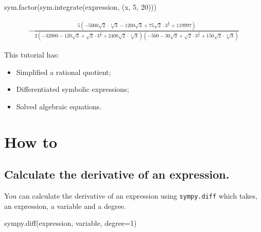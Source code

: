 \begin{pyin}
sym.factor(sym.integrate(expression, (x, 5, 20)))
\end{pyin}




\begin{equation*}
\begin{split}\displaystyle - \frac{5 \left(- 5000 \sqrt{2} \cdot \sqrt[4]{3} - 1200 \sqrt{3} + 75 \sqrt{2} \cdot 3^{\frac{3}{4}} + 119997\right)}{2 \left(-32000 - 120 \sqrt{3} + \sqrt{2} \cdot 3^{\frac{3}{4}} + 2400 \sqrt{2} \cdot \sqrt[4]{3}\right) \left(-500 - 30 \sqrt{3} + \sqrt{2} \cdot 3^{\frac{3}{4}} + 150 \sqrt{2} \cdot \sqrt[4]{3}\right)}\end{split}
\end{equation*}



\begin{note}
This tutorial has:
\begin{itemize}

\item 
    Simplified a rational quotient;

\item 

Differentiated symbolic expressions;


\item 

Solved algebraic equations.

\end{itemize}
\end{note}




\section{How to}
\label{\detokenize{tools-for-mathematics/03-calculus/how/main:how}}\label{\detokenize{tools-for-mathematics/03-calculus/how/main::doc}}

\subsection{Calculate the derivative of an expression.}
\label{\detokenize{tools-for-mathematics/03-calculus/how/main:calculate-the-derivative-of-an-expression}}

You can calculate the derivative of an expression using \texttt{sympy.diff} which takes,
an expression, a variable and a degree.


\begin{api}
sympy.diff(expression, variable, degree=1)
\end{api}



